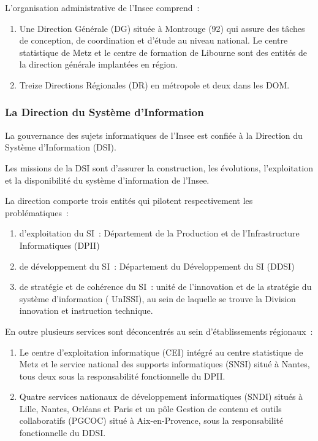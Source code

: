 L'organisation administrative de l'Insee comprend~:
\begin{enumerate}
    \item Une Direction Générale (DG) située à Montrouge (92) qui assure des tâches de conception, de coordination et d'étude au niveau national. Le centre statistique de Metz et le centre de formation de Libourne sont des entités de la direction générale implantées en région.
    \item Treize Directions Régionales (DR) en métropole et deux dans les DOM.
\end{enumerate}

\subsubsection*{La Direction du Système d'Information}

La gouvernance des sujets informatiques de l’Insee est confiée à la Direction du Système d'Information (DSI). 
\newline

Les missions de la DSI sont d’assurer la construction, les évolutions, l'exploitation et la disponibilité du système d'information de l'Insee.
\newline

La direction comporte trois entités qui pilotent respectivement les problématiques~:
\begin{enumerate}
    \item d'exploitation du SI~: Département de la Production et de l'Infrastructure Informatiques (DPII)
    \item de développement du SI~: Département du Développement du SI (DDSI)
    \item de stratégie et de cohérence du SI~: unité de l'innovation et de la stratégie du système d'information ( UnISSI), au sein de laquelle se trouve la Division innovation et instruction technique.
    \newline
\end{enumerate}

En outre plusieurs services sont déconcentrés au sein d’établissements régionaux~:
\begin{enumerate}
    \item  Le centre d’exploitation informatique (CEI) intégré au centre statistique de Metz et le service national des supports informatiques (SNSI) situé à Nantes, tous deux sous la responsabilité fonctionnelle du DPII.
    \item Quatre services nationaux de développement informatiques (SNDI) situés à Lille, Nantes, Orléans et Paris et un pôle Gestion de contenu et outils collaboratifs (PGCOC) situé à Aix-en-Provence, sous la responsabilité fonctionnelle du DDSI.
\end{enumerate}

